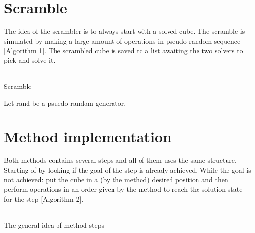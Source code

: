 \documentclass[a4paper,11pt]{kth-mag}
\begin{document}
\section{Scramble}
The idea of the scrambler is to always start with a solved cube. The scramble is simulated by making a large amount of operations in pseudo-random sequence [Algorithm 1]. The scrambled cube is saved to a list awaiting the two solvers to pick and solve it.\\\\
	\begin{algorithm}[H]
	\caption{Scramble}
	Let rand be a psuedo-random generator.\\

	\end{algorithm}

\section{Method implementation}
	Both methods contains several steps and all of them uses the same structure. Starting of by looking if the goal of the step is already achieved. While the goal is not achieved: put the cube in a (by the method) desired position and then perform operations in an order given by the method to reach the solution state for the step [Algorithm 2]. \\\\
	\begin{algorithm}[H]
	\caption{The general idea of method steps}
	\end{algorithm}

	
\end{document}
